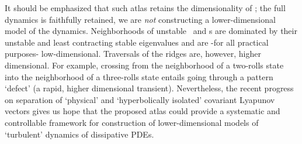 It should be emphasized that such atlas retains the dimensionality of
\reducedsp; the full dynamics is faithfully retained, we are \emph{not}
constructing a lower-dimensional model of the dynamics. Neighborhoods of
unstable \eqva\ and \po s are dominated by their unstable and least
contracting stable eigenvalues and are -for all practical purposes-
low-dimensional. Traversals of the ridges are, however, higher dimensional.
For example, crossing from the neighborhood of a two-rolls state into the
neighborhood of a three-rolls state entails going through a pattern
`defect' (a rapid, higher dimensional transient). Nevertheless, the recent progress on
separation of `physical' and `hyperbolically isolated' covariant Lyapunov
vectors gives us
hope that the proposed atlas could provide a systematic and controllable
framework for construction of lower-dimensional models of `turbulent'
dynamics of dissipative PDEs.

%

